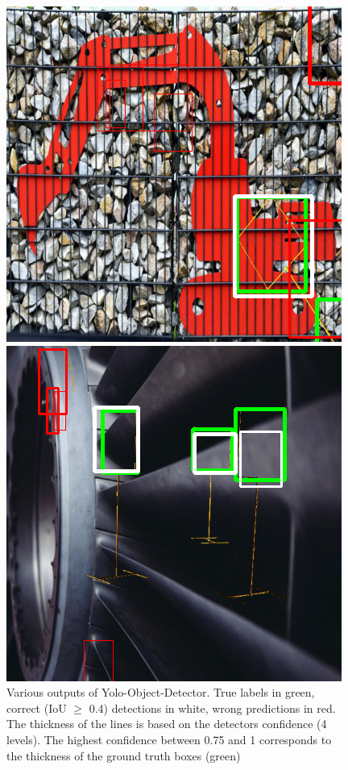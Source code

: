 \documentclass{article}
\begin{document}
\begin{figure}[h]
			\begin{minipage}{0.3\textwidth}
			\centering
			\includegraphics[width=\textwidth]{../fig/result3}
		\end{minipage}
			\begin{minipage}{0.3\textwidth}
			\centering
			\includegraphics[width=\textwidth]{../fig/result4}
		\end{minipage}
		\caption{Various outputs of Yolo-Object-Detector. True labels in green, correct (IoU $\geq$ 0.4) detections in white, wrong predictions in red. The thickness of the lines is based on the detectors confidence (4 levels). The highest confidence between 0.75 and 1 corresponds to the thickness of the ground truth boxes (green)}
		\label{fig:exps}
\end{figure}
\end{document}
